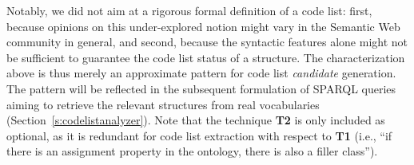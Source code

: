 Notably, we did not aim at a rigorous formal definition of a code list: first, because  opinions on this under-explored notion might vary in the Semantic Web community in general, and second, because the syntactic features alone might not be sufficient to guarantee the code list status of a structure. The characterization above is thus merely an approximate pattern for code list \emph{candidate} generation.
The pattern will be reflected in the subsequent formulation of SPARQL queries aiming to retrieve the relevant structures from real vocabularies (Section~\ref{s:codelistanalyzer}).
Note that the technique \textbf{T2} is only included as optional, as it is redundant for code list extraction with respect to \textbf{T1} (i.e., ``if there is an assignment property in the ontology, there is also a filler class''). 
